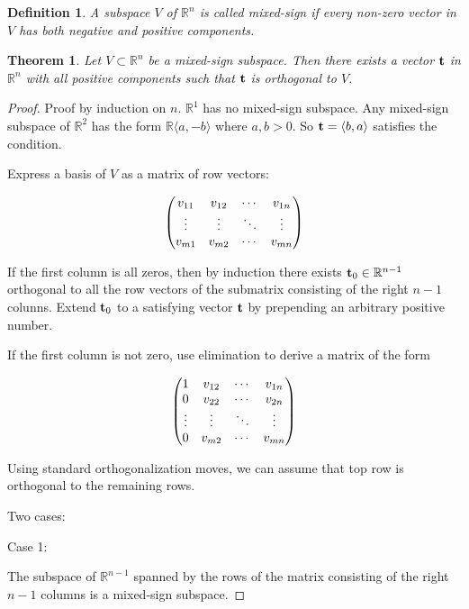 \documentclass[11pt]{article}
\theoremstyle{plain} \newtheorem{thm}{Theorem}%
\theoremstyle{plain} \newtheorem{define}{Definition}%
\theoremstyle{plain} \newtheorem{example}{Example}%
\theoremstyle{plain} \newtheorem{remark}{Remark}%
\newcommand{\reals}{\mathbb{R}}
\newcommand{\realn}{\mathbb{R}^n}
\newcommand{\mixed}{mixed-sign}
\begin{document}
\begin{define}
    A subspace $V$ of $\realn$ is called \mixed{} if every non-zero
    vector in $V$ has both negative and positive components.
\end{define}

\begin{thm}
    Let $V \subset \realn$ be a \mixed{} subspace.  Then there exists a
    vector $\bf t$ in $\realn$ with all positive components such that
    $\bf t$ is orthogonal to $V$.
\end{thm}

\begin{proof}
    Proof by induction on $n$.  $\reals^1$ has no \mixed{} subspace.
    Any \mixed{} subspace of $\reals^2$ has the form $\reals
    \langle a, -b\rangle$ where $a,b > 0$.  So ${\bf t} = \langle b,
    a\rangle$ satisfies the condition.

    Express a basis of $V$ as a matrix of row vectors:

    \begin{equation*}
    \begin{pmatrix}
    v_{11}&v_{12}&\cdots&v_{1n}\cr
    \vdots&\vdots&\ddots&\vdots\cr
    v_{m1}&v_{m2}&\cdots&v_{mn}\cr
    \end{pmatrix}
    \end{equation*}

    If the first column is all zeros, then by induction there exists
    ${\bf t}_0 \in \reals{}^{n-1}$ orthogonal to all the row vectors of
    the submatrix consisting of the right $n-1$ colunns.  Extend
    ${\bf t}_0$ to a satisfying vector $\bf t$ by prepending an arbitrary
    positive number.

    If the first column is not zero, use elimination to derive a matrix
    of the form

    \begin{equation*}
    \begin{pmatrix}
    1&v_{12}&\cdots&v_{1n}\cr
    0&v_{22}&\cdots&v_{2n}\cr
    \vdots&\vdots&\ddots&\vdots\cr
    0&v_{m2}&\cdots&v_{mn}\cr
    \end{pmatrix}
    \end{equation*}

    Using standard orthogonalization moves, we can assume that top row
    is orthogonal to the remaining rows.

    \medskip
    \noindent Two cases:

    \noindent Case 1:

    The subspace of $\reals^{n-1}$ spanned by the rows of the
    matrix consisting of the right $n-1$ columns is a \mixed{} subspace.


\end{proof}
\end{document}
